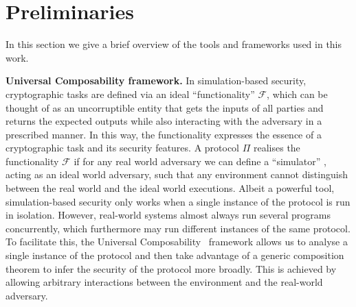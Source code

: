 \section{Preliminaries}
\label{sec:preliminaries}
  In this section we give a brief overview of the tools and frameworks used in
  this work.

  \noindent \textbf{Universal Composability framework.}
    In simulation-based security, cryptographic tasks are defined via an ideal
    ``functionality'' $\mathcal{F}$, which can be thought of as an uncorruptible
    entity that gets the inputs of all parties and returns the expected outputs
    while also interacting with the adversary in a prescribed manner. In this
    way, the functionality expresses the essence of a cryptographic task and its
    security features. A protocol $\Pi$ realises the functionality $\mathcal{F}$
    if for any  real world adversary we can define a ``simulator'' \simulator{},
    acting as an ideal world adversary, such that any environment \environment{}
    cannot distinguish between the real world and the ideal world executions.
    Albeit a powerful tool, simulation-based security only works when a single
    instance of the protocol is run in isolation. However, real-world systems
    almost always run several programs concurrently, which furthermore may run
    different instances of the same protocol. To facilitate this, the Universal
    Composability~\cite{uc} framework allows us to analyse a single instance of
    the protocol and then take advantage of a generic composition theorem to
    infer the security of the protocol more broadly. This is achieved by
    allowing arbitrary interactions between the environment and the real-world
    adversary.


